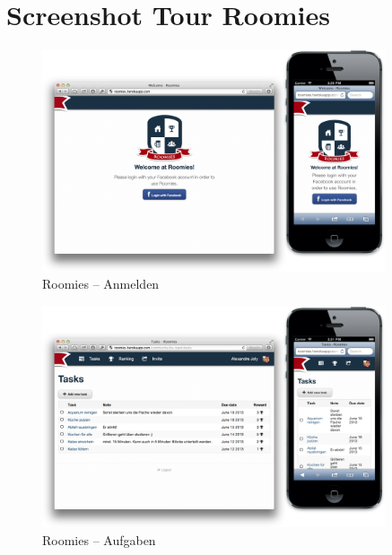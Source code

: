 \chapter{Screenshot Tour Roomies}
\label{sec:roomies-screenshots}

\begin{figure}[H]
	\centering
	\includegraphics[width=0.9\textwidth]{content/appendix/roomies-screenshots/login.png}
	\caption{Roomies -- Anmelden}
	\label{fig:roomies-ss-login}
\end{figure}

\begin{figure}[H]
	\centering
	\includegraphics[width=0.9\textwidth]{content/appendix/roomies-screenshots/task.png}
	\caption{Roomies -- Aufgaben}
	\label{fig:roomies-ss-task}
\end{figure}

